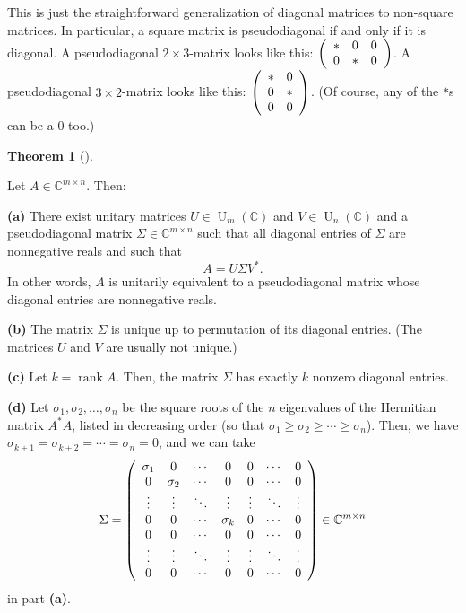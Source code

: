 \documentclass[numbers=enddot,12pt,final,onecolumn,notitlepage]{scrartcl}%
\numberwithin{exer}{subsection}
\theoremstyle{definition}
\newtheorem{theo}{Theorem}[subsection]
\newenvironment{theorem}[1][]
{\begin{theo}[#1]\begin{leftbar}}
{\end{leftbar}\end{theo}}
\begin{document}
This is just the straightforward generalization of diagonal matrices to
non-square matrices. In particular, a square matrix is pseudodiagonal if and
only if it is diagonal. A pseudodiagonal $2\times3$-matrix looks like this:
$\left(
\begin{array}
[c]{ccc}%
\ast & 0 & 0\\
0 & \ast & 0
\end{array}
\right)  $. A pseudodiagonal $3\times2$-matrix looks like this: $\left(
\begin{array}
[c]{cc}%
\ast & 0\\
0 & \ast\\
0 & 0
\end{array}
\right)  $. (Of course, any of the $\ast$s can be a $0$ too.)

\begin{theorem}
[SVD]\label{thm.svd.svd}Let $A\in\mathbb{C}^{m\times n}$. Then: \medskip

\textbf{(a)} There exist unitary matrices $U\in\operatorname*{U}%
\nolimits_{m}\left(  \mathbb{C}\right)  $ and $V\in\operatorname*{U}%
\nolimits_{n}\left(  \mathbb{C}\right)  $ and a pseudodiagonal matrix
$\Sigma\in\mathbb{C}^{m\times n}$ such that all diagonal entries of $\Sigma$
are nonnegative reals and such that%
\[
A=U\Sigma V^{\ast}.
\]
In other words, $A$ is unitarily equivalent to a pseudodiagonal matrix whose
diagonal entries are nonnegative reals. \medskip

\textbf{(b)} The matrix $\Sigma$ is unique up to permutation of its diagonal
entries. (The matrices $U$ and $V$ are usually not unique.) \medskip

\textbf{(c)} Let $k=\operatorname*{rank}A$. Then, the matrix $\Sigma$ has
exactly $k$ nonzero diagonal entries. \medskip

\textbf{(d)} Let $\sigma_{1},\sigma_{2},\ldots,\sigma_{n}$ be the square roots
of the $n$ eigenvalues of the Hermitian matrix $A^{\ast}A$, listed in
decreasing order (so that $\sigma_{1}\geq\sigma_{2}\geq\cdots\geq\sigma_{n}$).
Then, we have $\sigma_{k+1}=\sigma_{k+2}=\cdots=\sigma_{n}=0$, and we can
take
\[
\Sigma=\left(
\begin{array}
[c]{ccccccc}%
\sigma_{1} & 0 & \cdots & 0 & 0 & \cdots & 0\\
0 & \sigma_{2} & \cdots & 0 & 0 & \cdots & 0\\
\vdots & \vdots & \ddots & \vdots & \vdots & \ddots & \vdots\\
0 & 0 & \cdots & \sigma_{k} & 0 & \cdots & 0\\
0 & 0 & \cdots & 0 & 0 & \cdots & 0\\
\vdots & \vdots & \ddots & \vdots & \vdots & \ddots & \vdots\\
0 & 0 & \cdots & 0 & 0 & \cdots & 0
\end{array}
\right)  \in\mathbb{C}^{m\times n}%
\]
in part \textbf{(a)}.
\end{theorem}
\end{document}
